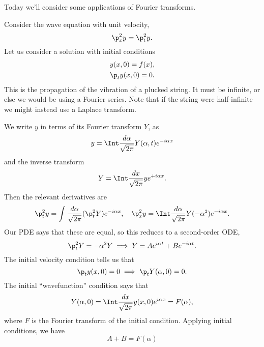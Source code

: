 Today we'll consider some applications of Fourier transforms.
\begin{exm}
    Consider the wave equation with unit velocity,
    \begin{equation}
        \p_x^2 y = \p_t^2 y.
    \end{equation}
    Let us consider a solution with initial conditions
    \begin{gather}
        y(x,0) = f(x),\\
        \p_t y(x,0) = 0.
    \end{gather}
    This is the propagation of the vibration of a plucked string. It must be infinite, or else we would be using a Fourier series. Note that if the string were half-infinite we might instead use a Laplace transform.
    
    We write $y$ in terms of its Fourier transform $Y$, as
    \begin{equation}
        y= \Int \frac{d\alpha}{\sqrt{2\pi}} Y(\alpha, t) e^{-i\alpha x}
    \end{equation}
    and the inverse transform
    \begin{equation}
        Y= \Int \frac{dx}{\sqrt{2\pi}} y e^{+i\alpha x}.
    \end{equation}
    Then the relevant derivatives are 
    \begin{equation}
        \p_t^2 y =\int \frac{d\alpha}{\sqrt{2\pi}} (\p_t^2 Y) e^{-i\alpha x}, \quad \p_x^2 y = \Int \frac{d\alpha}{\sqrt{2\pi}} Y (-\alpha^2) e^{-i\alpha x}.
    \end{equation}
    Our PDE says that these are equal, so this reduces to a second-order ODE,
    \begin{equation}
        \p_t^2 Y = -\alpha^2 Y \implies Y= Ae^{i\alpha t} + B e^{-i\alpha t}.
    \end{equation}
    The initial velocity condition tells us that
    \begin{equation}
        \p_t y(x,0) = 0 \implies \p_t Y(\alpha,0) = 0.
    \end{equation}
    The initial ``wavefunction'' condition says that
    \begin{equation}
        Y(\alpha,0) = \Int \frac{dx}{\sqrt{2\pi}} y(x,0) e^{i\alpha x} = F(\alpha),
    \end{equation}
    where $F$ is the Fourier transform of the initial condition. Applying initial conditions, we have
    \begin{equation}
        A+B=F(\alpha)
    \end{equation}

\end{exm}
